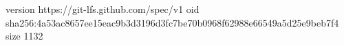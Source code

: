 version https://git-lfs.github.com/spec/v1
oid sha256:4a53ac8657ee15eac9b3d3196d3fc7be70b0968f62988e66549a5d25e9beb7f4
size 1132
